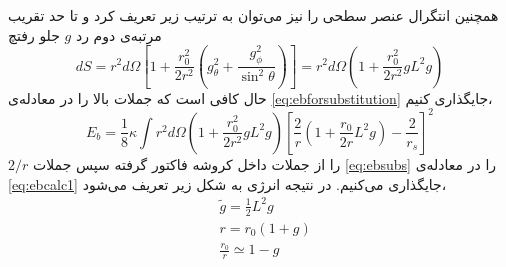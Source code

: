 همچنین انتگرال عنصر سطحی را نیز می‌توان به ترتیب زیر تعریف کرد و تا حد تقریب مرتبه‌ی دوم رد $g$ جلو رفتچ
\begin{equation}
dS=r^2d\Omega\left[1+\frac{r_0^2}{2r^2}\left(g_\theta^2+\frac{g_\phi^2}{\sin^2\theta}\right)\right]=r^2d\Omega\left(1+\frac{r_0^2}{2r^2}gL^2g\right)
\label{eq:dsL2}
\end{equation}
حال کافی است که جملات بالا را در معادله‌ی \ref{eq:ebforsubstitution} جایگذاری کنیم،
\begin{equation}
E_b=\frac{1}{8}\kappa\int r^2d\Omega\left(1+\frac{r_0^2}{2r^2}gL^2g\right)\left[\frac{2}{r}\left(1+\frac{r_0}{2r}L^2g\right)-\frac{2}{r_s}\right]^2
\label{eq:ebcalc1}
\end{equation}
 $2/r$ را از جملات داخل کروشه فاکتور گرفته سپس جملات 
 \ref{eq:ebsubs}
 را در معادله‌ی
 \ref{eq:ebcalc1}
 جایگذاری می‌کنیم‌. در نتیجه انرژی به شکل زیر تعریف می‌شود،
\begin{equation}
\begin{aligned}
&\tilde{g}=\frac{1}{2}L^2g\\
&r=r_0(1+g)\\
&\frac{r_0}{r}\simeq 1-g
\label{eq:ebsubs}
\end{aligned}
\end{equation}


